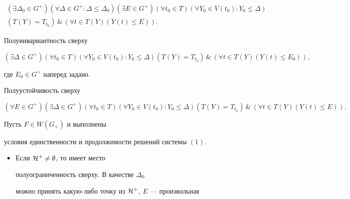{\begin{multline*}
(\exists\Delta_0\in G^+)(\forall\Delta\in G^+: 


\Delta\le\Delta_0)(\exists E\in G^+)(\forall t_0\in T) 


(\forall Y_0\in V(t_0):Y_0\le\Delta) \\


%


(T(Y)=T_{t_0})\,\&\,(\forall t\in T(Y)(Y(t)\le E)). 


\end{multline*}  


 


Полуинвариантность сверху 


$$ 


(\exists\Delta\in G^+)(\forall t_0\in T) 


(\forall Y_0\in V(t_0):Y_0\le\Delta) 


(T(Y)=T_{t_0})\,\&\,(\forall t\in T(Y) 


(Y(t)\le E_0)), 


$$ 


где $E_0\in G^+$ наперед задано. 


 


Полуустойчивость сверху 


$$ 


(\forall E\in G^+)(\exists\Delta\in G^+) 


(\forall t_0\in T)(\forall Y_0\in V(t_0):Y_0\le\Delta) 


(T(Y)=T_{t_0})\,\&\,(\forall t\in T(Y)


(Y(t)\le E)). 


$$ 


 


\begin{thm} Пусть $F\in W(G_+)$ и выполнены 


условия единственности и продолжимости решений системы $(1)$. 


\begin{itemize} 


\item[А.] Если $\cal H^+\ne\emptyset$, то имеет место 


полуограниченность сверху. В качестве $\Delta_0$ 


можно принять какую-либо точку из $\cal H^+$, $E$ --- произвольная 



\end{itemize}
\end{thm}}
